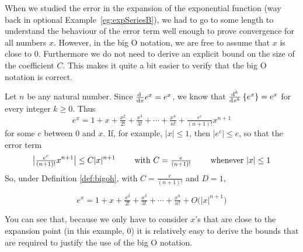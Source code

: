 When we studied the error in the expansion of the exponential function
(way back in optional Example~\ref{eg:expSeriesB}), we had to go to
some length to understand the behaviour of the error term well enough
to prove convergence for all numbers $x$.
However, in the big O notation, we are free to assume that
$x$ is close to $0$. Furthermore we do not need to derive an explicit bound
on the size of the coefficient $C$. This makes it quite a bit easier to
verify that the big O notation is correct.
\begin{eg}\label{eg:bigohexp}
Let $n$ be any natural number.
Since $\diff{}{x} e^x = e^x$, we know that
$\frac{\mathrm{d}^k}{\mathrm{d}{x}^k}\left\{ e^x \right\} = e^x$ for every integer $k \geq 0$.
Thus
\begin{equation*}
e^x=1+x+\tfrac{x^2}{2!}+\tfrac{x^3}{3!}+\cdots+\tfrac{x^n}{n!}
          +\tfrac{e^c}{(n+1)!} x^{n+1}
\end{equation*}
for some $c$ between $0$ and $x$. If, for example, $|x|\le 1$, then
$|e^c|\le e$, so that the error term
\begin{equation*}
\big|\tfrac{e^c}{(n+1)!} x^{n+1}\big| \le  C|x|^{n+1}\qquad\hbox{ with }
C=\tfrac{e}{(n+1)!}\qquad\hbox{ whenever }|x|\le 1
\end{equation*}
So, under Definition \ref{def:bigoh}, with $C=\tfrac{e}{(n+1)!}$
and $D=1$,
\begin{impeqn}\label{eq:SRexpExp}
\begin{equation*}
e^x=1+x+\tfrac{x^2}{2!}+\tfrac{x^3}{3!}+\cdots+\tfrac{x^n}{n!}
          +O\big( |x|^{n+1}\big)
\end{equation*}
\end{impeqn}
You can see that, because we only have to consider $x$'s that are close to the
expansion point (in this example, $0$) it is relatively easy to derive
the bounds that are required to justify the use of the big O notation.
\end{eg}



